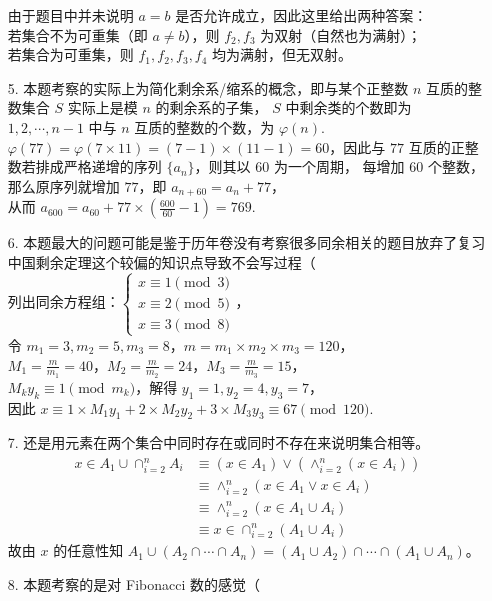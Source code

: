 \documentclass{ctexbook}
\begin{document}
\begin{enumerate}
    由于题目中并未说明 $a=b$ 是否允许成立，因此这里给出两种答案：\\
    若集合不为可重集（即 $a\neq b$），则 $f_2,f_3$ 为双射（自然也为满射）； \\
    若集合为可重集，则 $f_1,f_2,f_3,f_4$ 均为满射，但无双射。
    \item[5.] 本题考察的实际上为简化剩余系/缩系的概念，即与某个正整数 $n$ 互质的整数集合 $S$ 实际上是模 $n$ 的剩余系的子集，
    $S$ 中剩余类的个数即为 $1,2,\cdots,n-1$ 中与 $n$ 互质的整数的个数，为 $\varphi(n)$. \\
    $\varphi(77)=\varphi(7\times 11)=(7-1)\times(11-1)=60$，因此与 $77$ 互质的正整数若排成严格递增的序列 $\{a_n\}$，则其以 $60$ 为一个周期，
    每增加 $60$ 个整数，那么原序列就增加 $77$，即 $a_{n+60}=a_n+77$，\\
    从而 $a_{600}=a_{60}+77\times (\frac{600}{60}-1)=769$.
    \item[6.] 本题最大的问题可能是鉴于历年卷没有考察很多同余相关的题目放弃了复习中国剩余定理这个较偏的知识点导致不会写过程（ \\
    列出同余方程组：$\begin{cases}
        x\equiv 1\pmod{3} \\
        x\equiv 2\pmod{5} \\
        x\equiv 3\pmod{8}
    \end{cases}$，\\
    令 $m_1=3,m_2=5,m_3=8$，$m=m_1\times m_2\times m_3=120$，\\
    $M_1=\frac{m}{m_1}=40$，$M_2=\frac{m}{m_2}=24$，$M_3=\frac{m}{m_3}=15$，\\
    $M_ky_k\equiv 1\pmod{m_k}$，解得 $y_1=1,y_2=4,y_3=7$，\\
    因此 $x\equiv 1\times M_1y_1+2\times M_2y_2+3\times M_3y_3\equiv 67\pmod{120}$.
    \item[7.] 还是用元素在两个集合中同时存在或同时不存在来说明集合相等。
    \begin{align*} x\in A_1\cup\cap_{i=2}^n A_i &\equiv (x\in A_1) \lor (\land_{i=2}^n (x\in A_i)) \\
        &\equiv \land_{i=2}^n (x\in A_1 \lor x\in A_i) \\
        &\equiv \land_{i=2}^n (x\in A_1\cup A_i) \\
        &\equiv x\in \cap_{i=2}^n (A_1\cup A_i)
    \end{align*}故由 $x$ 的任意性知 $A_1\cup(A_2\cap\cdots\cap A_n)=(A_1\cup A_2)\cap\cdots\cap(A_1\cup A_n)$。
    \item[8.] 本题考察的是对 Fibonacci 数的感觉（ \\

\end{enumerate}
\end{document}
